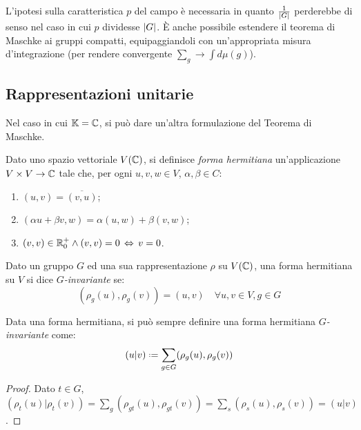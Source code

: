L'ipotesi sulla caratteristica $ p $ del campo è necessaria in quanto $ \frac{1}{\left\lvert G\right\rvert} $ perderebbe di senso nel caso in cui $ p $ dividesse $ \left\lvert G\right\rvert $. È anche possibile estendere il teorema di Maschke ai gruppi compatti, equipaggiandoli con un'appropriata misura d'integrazione (per rendere convergente $ \sum_{g} \rightarrow \int d\mu(g) $).

\subsection{Rappresentazioni unitarie}

Nel caso in cui $ \mathbb{K} = \mathbb{C} $, si può dare un'altra formulazione del Teorema di Maschke.

\begin{definition}
	Dato uno spazio vettoriale $ V(\mathbb{C}) $, si definisce \textit{forma hermitiana} un'applicazione $ V \times V \rightarrow \mathbb{C} $ tale che, per ogni $ u,v,w \in V $, $ \alpha,\beta \in C $:
	\begin{enumerate}
		\item $ (u,v) = \overline{(v,u)} $;
		\item $ (\alpha u + \beta v, w) = \alpha (u,w) + \beta (v,w) $;
		\item $ (v,v) \in \mathbb{R}^+_0 \land (v,v) = 0 \,\Leftrightarrow\, v = 0 $.
	\end{enumerate}
\end{definition}

\begin{definition}
	Dato un gruppo $ G $ ed una sua rappresentazione $ \rho $ su $ V(\mathbb{C}) $, una forma hermitiana su $ V $ si dice $ G $\textit{-invariante} se:
	\begin{equation}
		(\rho_g(u),\rho_g(v)) = (u,v) \quad\forall u,v \in V, g \in G
		\label{eq:8.7}
	\end{equation}
\end{definition}

\begin{proposition}\label{herm-inv}
	Data una forma hermitiana, si può sempre definire una forma hermitiana $ G $\textit{-invariante} come:
	\begin{equation}
		(u|v) \defeq \sum_{g \in G} (\rho_g(u), \rho_g(v))
		\label{eq:8.8}
	\end{equation}
\end{proposition}
\begin{proof}
	Dato $ t \in G $, $ (\rho_t(u)|\rho_t(v)) = \sum_{g} (\rho_{gt}(u),\rho_{gt}(v)) = \sum_{s} (\rho_s(u),\rho_s(v)) = (u|v) $.
\end{proof}

